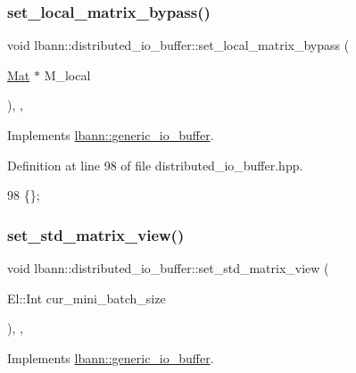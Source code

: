 \subsubsection{\texorpdfstring{set\+\_\+local\+\_\+matrix\+\_\+bypass()}{set\_local\_matrix\_bypass()}}
{\footnotesize\ttfamily void lbann\+::distributed\+\_\+io\+\_\+buffer\+::set\+\_\+local\+\_\+matrix\+\_\+bypass (\begin{DoxyParamCaption}\item[{\hyperlink{base_8hpp_a68f11fdc31b62516cb310831bbe54d73}{Mat} $\ast$}]{M\+\_\+local }\end{DoxyParamCaption})\hspace{0.3cm}{\ttfamily [inline]}, {\ttfamily [override]}, {\ttfamily [virtual]}}



Implements \hyperlink{classlbann_1_1generic__io__buffer_af84c26ab5ee77d1d9ed9ea5d62823815}{lbann\+::generic\+\_\+io\+\_\+buffer}.



Definition at line 98 of file distributed\+\_\+io\+\_\+buffer.\+hpp.


\begin{DoxyCode}
98 \{\};
\end{DoxyCode}
\mbox{\label{classlbann_1_1distributed__io__buffer_a996d9d20ad162b3edb06fb8aa04ecd3d}} 
\subsubsection{\texorpdfstring{set\+\_\+std\+\_\+matrix\+\_\+view()}{set\_std\_matrix\_view()}}
{\footnotesize\ttfamily void lbann\+::distributed\+\_\+io\+\_\+buffer\+::set\+\_\+std\+\_\+matrix\+\_\+view (\begin{DoxyParamCaption}\item[{El\+::\+Int}]{cur\+\_\+mini\+\_\+batch\+\_\+size }\end{DoxyParamCaption})\hspace{0.3cm}{\ttfamily [inline]}, {\ttfamily [override]}, {\ttfamily [virtual]}}



Implements \hyperlink{classlbann_1_1generic__io__buffer_a458d9bf722effce4177a0ac0aee9124f}{lbann\+::generic\+\_\+io\+\_\+buffer}.



